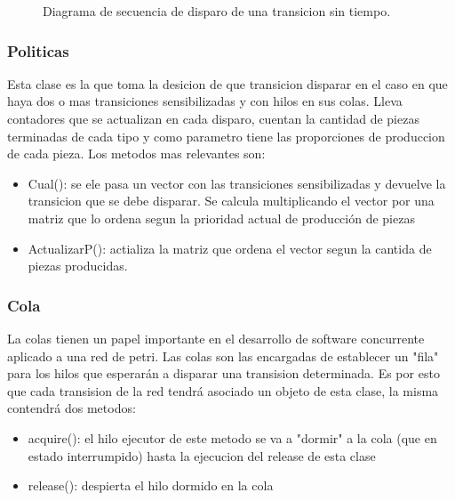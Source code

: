 \documentclass[10pt, a4paper,notitlepage]{article}
\begin{document}
\begin{figure}[H] %
	\caption{Diagrama de secuencia de disparo de una transicion sin tiempo.}
	\label{fig:sec}
\end{figure}

\subsubsection{Politicas}
Esta clase es la que toma la desicion de que transicion disparar en el caso en que haya dos o mas transiciones sensibilizadas y con hilos en sus colas. Lleva contadores que se actualizan en cada disparo, cuentan la cantidad de piezas terminadas de cada tipo y como parametro tiene las proporciones de produccion de cada pieza. Los metodos mas relevantes son:
\begin{itemize}
	\item Cual(): se ele pasa un vector con las transiciones sensibilizadas y devuelve la transicion que se debe disparar. Se calcula multiplicando el vector por una matriz que lo ordena segun la prioridad actual de producción de piezas
	\item ActualizarP(): actializa la matriz que ordena el vector segun la cantida de piezas producidas.
\end{itemize}
\subsubsection{Cola}
La colas tienen un papel importante en el desarrollo de software concurrente aplicado a una red de petri. Las colas son las encargadas de establecer un "fila" para los hilos que esperarán a disparar una transision determinada.
Es por esto que cada transision de la red tendrá asociado un objeto de esta clase, la misma contendrá dos metodos:
\begin{itemize}
	\item acquire(): el hilo ejecutor de este metodo se va a "dormir" a la cola (que en estado interrumpido) hasta la ejecucion del release de esta clase
	\item release(): despierta el hilo dormido en la cola
\end{itemize}
\end{document}

